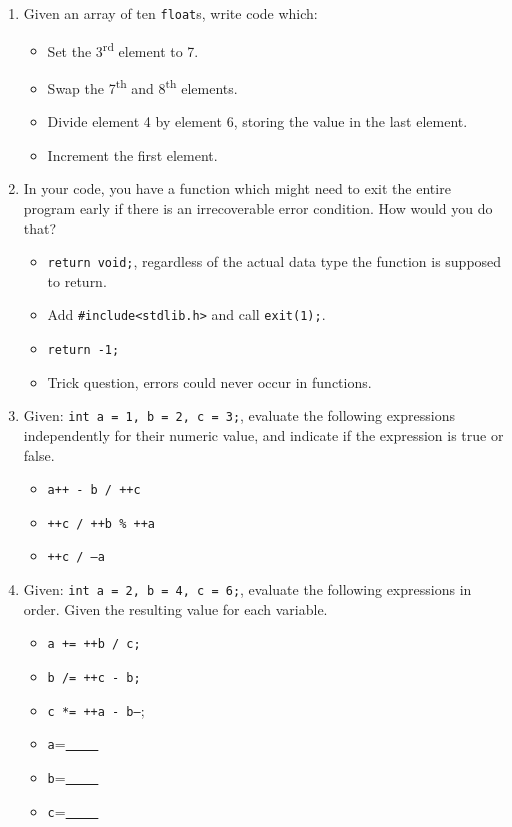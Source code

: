 \documentclass[letter,11pt]{article}
\begin{document}
\begin{enumerate}
    \item Given an array of ten \texttt{float}s, write code which:
    \begin{itemize}
        \item Set the 3\textsuperscript{rd} element to 7.
        \item Swap the 7\textsuperscript{th} and 8\textsuperscript{th} elements.
        \item Divide element 4 by element 6, storing the value in the last element.
        \item Increment the first element.
    \end{itemize}
    
    \item In your code, you have a function which might need to exit the entire program early if there is an irrecoverable error condition. How would you do that?
    \begin{itemize}
        \item \texttt{return void;}, regardless of the actual data type the function is supposed to return.
        \item Add \texttt{\#include<stdlib.h>} and call \texttt{exit(1);}.
        \item \texttt{return -1;}
        \item Trick question, errors could never occur in functions.
    \end{itemize}
    
    \item Given: \texttt{int a = 1, b = 2, c = 3;}, evaluate the following expressions independently for their numeric value, and indicate if the expression is true or false.
    \begin{itemize}
        \item \texttt{a++ - b / ++c}
        \item \texttt{++c / ++b \% ++a}
        \item \texttt{++c / --a}
    \end{itemize}
    
    \item Given: \texttt{int a = 2, b = 4, c = 6;}, evaluate the following expressions in order. Given the resulting value for each variable.
    \begin{itemize}
        \item \texttt{a += ++b / c;}
        \item \texttt{b /= ++c - b;}
        \item \texttt{c *= ++a - b--};
        \item \texttt{a}=\underline{~~ ~~}
        \item \texttt{b}=\underline{~~ ~~}
        \item \texttt{c}=\underline{~~ ~~}
    \end{itemize}
    

\end{enumerate}
\end{document}
